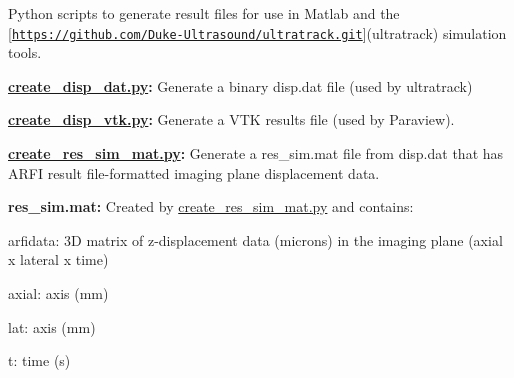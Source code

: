 Python scripts to generate result files for use in Matlab and the \mbox{[}\href{https://github.com/Duke-Ultrasound/ultratrack.git}{\tt https\+://github.\+com/\+Duke-\/\+Ultrasound/ultratrack.\+git}\mbox{]}(ultratrack) simulation tools.


\begin{DoxyItemize}
\item {\bfseries \hyperlink{create__disp__dat_8py}{create\+\_\+disp\+\_\+dat.\+py}\+:} Generate a binary {\ttfamily disp.\+dat} file (used by {\ttfamily ultratrack})
\item {\bfseries \hyperlink{create__disp__vtk_8py}{create\+\_\+disp\+\_\+vtk.\+py}\+:} Generate a V\+T\+K results file (used by Paraview).
\item {\bfseries \hyperlink{create__res__sim__mat_8py}{create\+\_\+res\+\_\+sim\+\_\+mat.\+py}\+:} Generate a {\ttfamily res\+\_\+sim.\+mat} file from {\ttfamily disp.\+dat} that has A\+R\+F\+I result file-\/formatted imaging plane displacement data.
\item {\bfseries res\+\_\+sim.\+mat\+:} Created by {\ttfamily \hyperlink{create__res__sim__mat_8py}{create\+\_\+res\+\_\+sim\+\_\+mat.\+py}} and contains\+:
\begin{DoxyItemize}
\item {\ttfamily arfidata}\+: 3\+D matrix of z-\/displacement data (microns) in the imaging plane (axial x lateral x time)
\item {\ttfamily axial}\+: axis (mm)
\item {\ttfamily lat}\+: axis (mm)
\item {\ttfamily t}\+: time (s) 
\end{DoxyItemize}
\end{DoxyItemize}